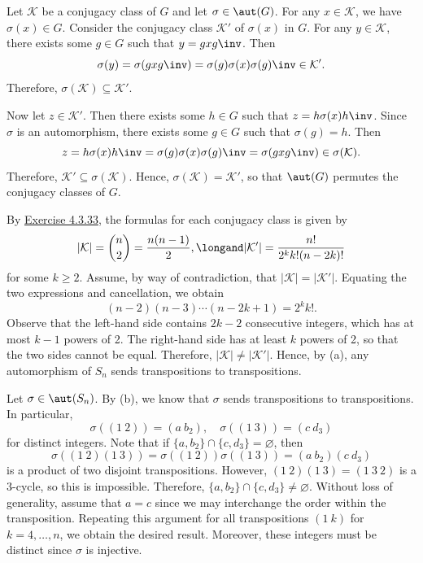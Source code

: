 \begin{solalph}
	\item Let $\mathcal K$ be a conjugacy class of $G$ and let $\sigma \in \aut(G)$. For any $x \in \mathcal K$, we have $\sigma(x) \in G$. Consider the conjugacy class $\mathcal K'$ of $\sigma(x)$ in $G$. For any $y \in \mathcal K$, there exists some $g \in G$ such that $y = gxg\inv$. Then
	\[\sigma(y) = \sigma(gxg\inv) = \sigma(g)\sigma(x)\sigma(g)\inv \in \mathcal K'.\]
	Therefore, $\sigma(\mathcal K) \subseteq \mathcal K'$.

	Now let $z \in \mathcal K'$. Then there exists some $h \in G$ such that $z = h\sigma(x)h\inv$. Since $\sigma$ is an automorphism, there exists some $g \in G$ such that $\sigma(g) = h$. Then
	\[z = h\sigma(x)h\inv = \sigma(g)\sigma(x)\sigma(g)\inv = \sigma(gxg\inv) \in \sigma(\mathcal K).\]
	Therefore, $\mathcal K' \subseteq \sigma(\mathcal K)$. Hence, $\sigma(\mathcal K) = \mathcal K'$, so that $\aut(G)$ permutes the conjugacy classes of $G$.
	\item By \hyperref[ex4.3.33]{Exercise 4.3.33}, the formulas for each conjugacy class is given by
	\[|\mathcal K| = \binom n2 = \frac{n(n - 1)}{2}, \longand |\mathcal K'| = \frac{n!}{2^k k! (n - 2k)!}\]
	for some $k \geq 2$. Assume, by way of contradiction, that $|\mathcal K| = |\mathcal K'|$. Equating the two expressions and cancellation, we obtain
	\[(n - 2)(n - 3) \cdots (n - 2k + 1) = 2^k k!.\]
	Observe that the left-hand side contains $2k - 2$ consecutive integers, which has at most $k - 1$ powers of 2. The right-hand side has at least $k$ powers of 2, so that the two sides cannot be equal. Therefore, $|\mathcal K| \neq |\mathcal K'|$. Hence, by (a), any automorphism of $S_n$ sends transpositions to transpositions.
	\item Let $\sigma \in \aut(S_n)$. By (b), we know that $\sigma$ sends transpositions to transpositions. In particular,
	\[\sigma((1\ 2)) = (a\ b_2), \quad \sigma((1\ 3)) = (c\ d_3)\]
	for distinct integers. Note that if $\{a, b_2\} \cap \{c, d_3\} = \varnothing$, then
	\[\sigma((1\ 2)(1\ 3)) = \sigma((1\ 2))\sigma((1\ 3)) = (a\ b_2)(c\ d_3)\]
	is a product of two disjoint transpositions. However, $(1\ 2)(1\ 3) = (1\ 3\ 2)$ is a 3-cycle, so this is impossible. Therefore, $\{a, b_2\} \cap \{c, d_3\} \neq \varnothing$. Without loss of generality, assume that $a = c$ since we may interchange the order within the transposition. Repeating this argument for all transpositions $(1\ k)$ for $k = 4, \ldots, n$, we obtain the desired result. Moreover, these integers must be distinct since $\sigma$ is injective.

\end{solalph}
